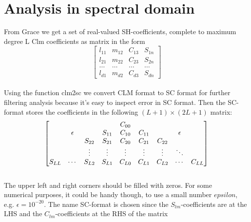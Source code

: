 \documentclass[a4paper,12pt]{report}
\begin{document}
\chapter{Analysis in spectral domain}
From Grace we get a set of real-valued SH-coefficients, complete to maximum degree L
Clm coefficients as matrix in the form\\
\[
\begin{bmatrix}
    l_{11}       & m_{12} & C_{13} & S_{1n} \\
    l_{21}       & m_{22} & C_{23} & S_{2n} \\
    \ldots & \ldots & \ldots & \ldots \\
    l_{d1}       & m_{d2} & C_{d3} & S_{dn}
\end{bmatrix}
\]\\
Using the function clm2sc we convert CLM format to SC format for further filtering analysis because it's easy to inspect error in SC format.
Then the SC-format stores the coefficients in the following $(L + 1)\times (2L + 1)$ matrix:\\

\[
\centering%
\begin{bmatrix}%
      &         &         &         & C_{00}   &         &         &             & \\
      & \epsilon&         & S_{11}  & C_{10}   &C_{11}   &         & \epsilon    & \\
      &         & S_{22}  & S_{21}  & C_{20}   & C_{21}  & C_{22}  &             & \\
      &         &\vdots{} &\vdots{} & \vdots{} &\vdots{} &\vdots{} &\ddots       & \\
      S_{LL}    &\cdots   & S_{L2}  & S_{L1}   & C_{L0}  & C_{L1}  & C_{L2}      &\cdots &C_{LL}
\end{bmatrix}%
\]\\
The upper left and right corners should be filled with zeros. For some \\ numerical purposes,
it could be handy though, to use a small number $epsilon$, e.g. $\epsilon = 10^{-20}$.
The name SC-format is chosen since the $S_{lm}$-coefficients are at the LHS and the $C_{lm}$-coefficients at the RHS of the matrix\\
\end{document}
